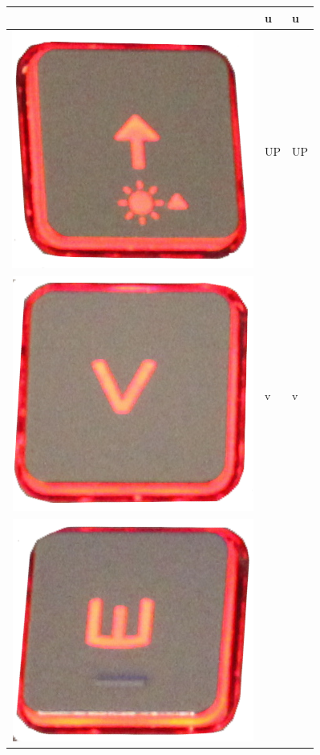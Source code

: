 \begin{longtable}{|cll|}
\begin{minipage}[c]{.3\textwidth}
\vspace{0.2cm}
\end{minipage} & u & u\\
\hline
\begin{minipage}[c]{.3\textwidth}
\vspace{0.2cm}
\includegraphics[scale=0.06]{Images/KeyMapping/UP}
\vspace{0.2cm}
\end{minipage} & UP & UP\\
\hline
\begin{minipage}[c]{.3\textwidth}
\vspace{0.2cm}
\includegraphics[scale=0.06]{Images/KeyMapping/v}
\vspace{0.2cm}
\end{minipage} & v & v\\
\hline
\begin{minipage}[c]{.3\textwidth}
\vspace{0.2cm}
\includegraphics[scale=0.06]{Images/KeyMapping/w}

\end{minipage}
\end{longtable}
